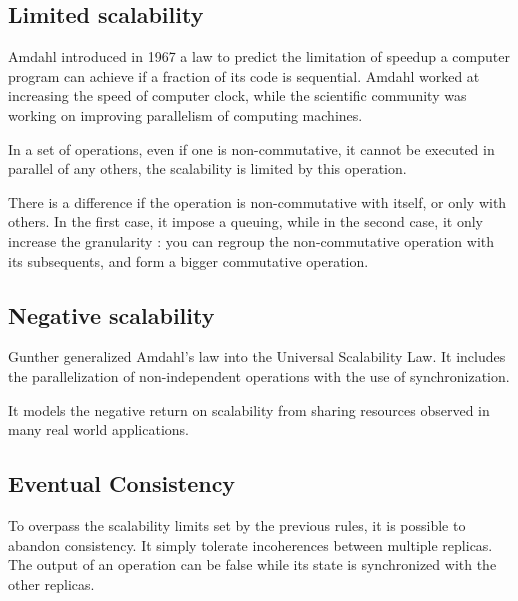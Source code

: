 
\subsection{Limited scalability}

Amdahl introduced in 1967 a law to predict the limitation of speedup a computer program can achieve if a fraction of its code is sequential.
Amdahl worked at increasing the speed of computer clock, while the scientific community was working on improving parallelism of computing machines.

In a set of operations, even if one is non-commutative, it cannot be executed in parallel of any others, the scalability is limited by this operation.

There is a difference if the operation is non-commutative with itself, or only with others.
In the first case, it impose a queuing, while in the second case, it only increase the granularity : you can regroup the non-commutative operation with its subsequents, and form a bigger commutative operation.


\subsection{Negative scalability}

Gunther generalized Amdahl's law into the Universal Scalability Law.
It includes the parallelization of non-independent operations with the use of synchronization.

It models the negative return on scalability from sharing resources observed in many real world applications.




\subsection{Eventual Consistency}

To overpass the scalability limits set by the previous rules, it is possible to abandon consistency.
It simply tolerate incoherences between multiple replicas.
The output of an operation can be false while its state is synchronized with the other replicas.




